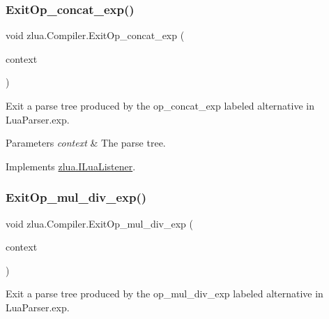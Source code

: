 \subsubsection{\texorpdfstring{Exit\+Op\+\_\+concat\+\_\+exp()}{ExitOp\_concat\_exp()}}
{\footnotesize\ttfamily void zlua.\+Compiler.\+Exit\+Op\+\_\+concat\+\_\+exp (\begin{DoxyParamCaption}\item[{\mbox{[}\+Not\+Null\mbox{]} \mbox{\hyperlink{classzlua_1_1_lua_parser_1_1_op__concat__exp_context}{Lua\+Parser.\+Op\+\_\+concat\+\_\+exp\+Context}}}]{context }\end{DoxyParamCaption})}



Exit a parse tree produced by the {\ttfamily op\+\_\+concat\+\_\+exp} labeled alternative in Lua\+Parser.\+exp. 


\begin{DoxyParams}{Parameters}
{\em context} & The parse tree.\\
\hline
\end{DoxyParams}


Implements \mbox{\hyperlink{interfacezlua_1_1_i_lua_listener_a5d79067d1b0d73aee302cf12972c0d4f}{zlua.\+I\+Lua\+Listener}}.

\mbox{\label{classzlua_1_1_compiler_a970ec54bed0c80f053b68a8dcff3a245}} 
\subsubsection{\texorpdfstring{Exit\+Op\+\_\+mul\+\_\+div\+\_\+exp()}{ExitOp\_mul\_div\_exp()}}
{\footnotesize\ttfamily void zlua.\+Compiler.\+Exit\+Op\+\_\+mul\+\_\+div\+\_\+exp (\begin{DoxyParamCaption}\item[{\mbox{[}\+Not\+Null\mbox{]} \mbox{\hyperlink{classzlua_1_1_lua_parser_1_1_op__mul__div__exp_context}{Lua\+Parser.\+Op\+\_\+mul\+\_\+div\+\_\+exp\+Context}}}]{context }\end{DoxyParamCaption})}



Exit a parse tree produced by the {\ttfamily op\+\_\+mul\+\_\+div\+\_\+exp} labeled alternative in Lua\+Parser.\+exp. 


